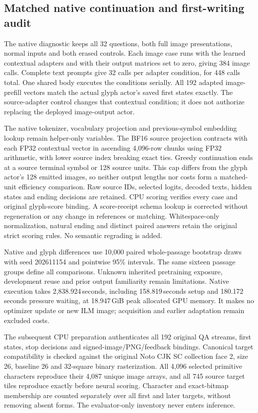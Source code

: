 \subsection*{Matched native continuation and first-writing audit}
The native diagnostic keeps all 32 questions, both full image presentations,
normal inputs and both erased controls. Each image case runs with the learned
contextual adapters and with their output matrices set to zero, giving 384
image calls. Complete text prompts give 32 calls per adapter condition,
for 448 calls total. One shared body executes the conditions serially.
All 192 adapted image-prefill vectors match the actual glyph actor's saved
first states exactly. The source-adapter control changes that contextual
condition; it does not authorize replacing the deployed image-output actor.

The native tokenizer, vocabulary projection and previous-symbol embedding
lookup remain helper-only variables. The BF16 source projection contracts
with each FP32 contextual vector in ascending 4,096-row chunks using FP32
arithmetic, with lower source index breaking exact ties. Greedy continuation
ends at a source terminal symbol or 128 source units. This cap differs from
the glyph actor's 128 emitted images, so neither output lengths nor costs
form a matched-unit efficiency comparison. Raw source IDs, selected logits, decoded
texts, hidden states and ending decisions are retained. CPU scoring verifies
every case and original glyph-score binding. A score-receipt schema lookup
is corrected without regeneration or any change in references or matching.
Whitespace-only normalization, natural ending and distinct paired answers
retain the original strict scoring rules. No semantic regrading is added.

Native and glyph differences use 10,000 paired whole-passage bootstrap draws
with seed 202611154 and pointwise 95\% intervals. The same sixteen passage
groups define all comparisons. Unknown inherited pretraining exposure,
development reuse and prior output familiarity remain limitations. Native
execution takes 2,838.924\,seconds, including 158.819\,seconds setup and 180.172\,seconds
pressure waiting, at 18.947\,GiB peak allocated GPU memory. It makes no optimizer
update or new ILM image; acquisition and earlier adaptation remain excluded
costs.

The subsequent CPU preparation authenticates all 192 original QA streams,
first states, stop decisions and signed-image/PNG/feedback bindings. Canonical
target compatibility is checked against the original Noto CJK SC collection
face 2, size 26, baseline 26 and 32-square binary rasterization. All 4,096 selected
primitive characters reproduce their 4,087 unique image arrays, and all 745
source target tiles reproduce exactly before neural scoring. Character and
exact-bitmap membership are counted separately over all first and later
targets, without removing absent forms. The evaluator-only inventory never
enters inference.

